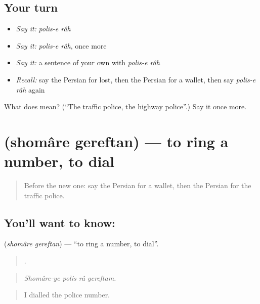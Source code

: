 \subsection*{Your turn}
\begin{itemize}
\raggedright
  \item \emph{Say it:} \emph{polis-e râh}
  \item \emph{Say it:} \emph{polis-e râh}, once more
  \item \emph{Say it:} a sentence of your own with \emph{polis-e râh}
  \item \emph{Recall:} say the Persian for lost, then the Persian for a wallet, then say \emph{polis-e râh} again
\end{itemize}

\begin{tcolorbox}[breakable,colback=teal!4,colframe=teal!35!black,title={Before you move on}]
What does   mean? (\textquotedblleft{}The traffic police, the highway police\textquotedblright{}.) Say it once more.
\end{tcolorbox}
\section[\texorpdfstring{\fa{شماره} \fa{گرفتن} (shomâre gereftan)}{شماره گرفتن (shomâre gereftan)}]{  (shomâre gereftan) — to ring a number, to dial}

\label{lesson:FA-C453-shomare-gereftan}



\begin{quote}
Before the new one: say the Persian for a wallet, then the Persian for the traffic police.
\end{quote}

\subsection*{You'll want to know:  }
\textbf{ } (\emph{shomâre gereftan}) — \textquotedblleft{}to ring a number, to dial\textquotedblright{}.

\begin{quote}
   .
\end{quote}

\begin{quote}
\emph{Shomâre-ye polis râ gereftam.}
\end{quote}

\begin{quote}
I dialled the police number.
\end{quote}


